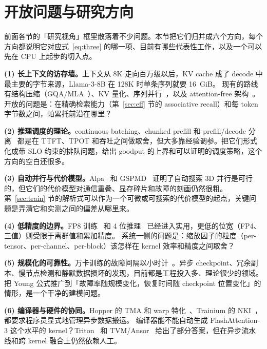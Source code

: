 \section{开放问题与研究方向}
\label{sec:open}

前面各节的「研究视角」框里散落着不少问题。本节把它们归并成六个方向，每个方向都说明它对应式~\eqref{eq:three} 的哪一项、目前有哪些代表性工作，以及一个可以先在 CPU 上起步的切入点。

\textbf{(1) 长上下文的访存墙。}上下文从 8K 走向百万级以后，KV cache 成了 decode 中最主要的字节来源，Llama-3-8B 在 128K 时单条序列就要 16~GiB。
现有的路线有结构压缩（GQA/MLA~\cite{ainslie2023gqa,deepseekai2024v2}）、KV 量化、序列并行~\cite{liu2023ring,jacobs2023deepspeed}，以及 attention-free 架构~\cite{gu2023mamba}。
开放的问题是：在精确检索能力（第~\ref{sec:eff} 节的 associative recall）和每 token 字节数之间，帕累托前沿在哪里？

\textbf{(2) 推理调度的理论。}continuous batching、chunked prefill 和 prefill/decode 分离~\cite{yu2022orca,agrawal2024sarathi,zhong2024distserve,patel2024splitwise}
都是在 TTFT、TPOT 和吞吐之间做取舍，但大多靠经验调参。把它们形式化成带 SLO 约束的排队问题，给出 goodput 的上界和可以证明的调度策略，这个方向的空白还很多。

\textbf{(3) 自动并行与代价模型。}Alpa~\cite{zheng2022alpa} 和 GSPMD~\cite{xu2021gspmd} 证明了自动搜索 3D 并行是可行的，但它们的代价模型对通信重叠、显存碎片和故障的刻画仍然很粗。
第~\ref{sec:train} 节的解析式可以作为一个可微或可搜索的代价模型的起点，关键问题是弄清它和实测之间的偏差从哪里来。

\textbf{(4) 低精度的边界。}FP8 训练~\cite{micikevicius2022fp8,deepseekai2024v3} 和 4 位推理~\cite{frantar2023gptq,lin2024awq} 已经进入实用，更低的位宽（FP4、三值）则受限于离群值和累加精度。
系统一侧的问题是：缩放因子的粒度（per-tensor、per-channel、per-block）该怎样在 kernel 效率和精度之间取舍？

\textbf{(5) 规模化的可靠性。}万卡训练的故障间隔以小时计~\cite{dubey2024llama3,jiang2024megascale}。异步 checkpoint、冗余副本、慢节点检测和静默数据损坏的发现，目前都是工程投入多、理论很少的领域。
把 Young 公式推广到「故障率随规模变化，恢复时间随 checkpoint 位置变化」的情形，是一个干净的建模问题。

\textbf{(6) 编译器与硬件的协同。}Hopper 的 TMA 和 warp 特化~\cite{shah2024flashattention3}、Trainium 的 NKI~\cite{awsneuron}，都要求程序员显式地管理异步数据搬运。
编译器能不能自动生成 FlashAttention-3 这个水平的 kernel？Triton~\cite{tillet2019triton} 和 TVM/Ansor~\cite{chen2018tvm,zheng2020ansor} 给出了部分答案，但在异步流水线和跨 kernel 融合上仍然依赖人工。

